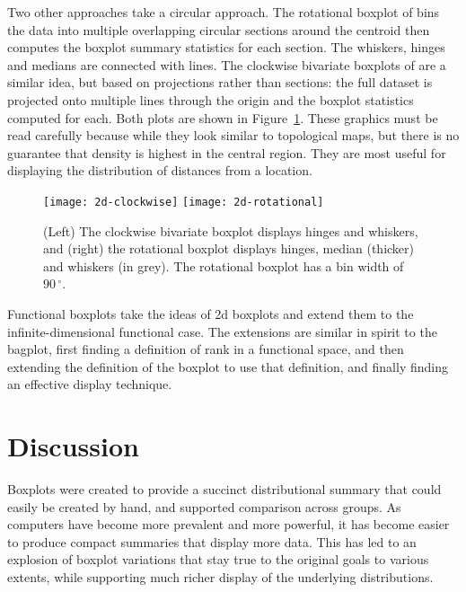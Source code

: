 \documentclass[oneside]{article}
\begin{document}
Two other approaches take a circular approach. The rotational boxplot of \citet{muth:2000} bins the data into multiple overlapping circular sections around the centroid then computes the boxplot summary statistics for each section. The whiskers, hinges and medians are connected with lines. The clockwise bivariate boxplots of \citet{corbellini:2002} are a similar idea, but based on projections rather than sections: the full dataset is projected onto multiple lines through the origin and the boxplot statistics computed for each. Both plots are shown in Figure~\ref{fig:2d-circular}. These graphics must be read carefully because while they look similar to topological maps, but there is no guarantee that density is highest in the central region. They are most useful for displaying the distribution of distances from a location.

\begin{figure}[htbp]
  \centering
  \texttt{[image: 2d-clockwise]}%
  \texttt{[image: 2d-rotational]}%

  \caption{(Left) The clockwise bivariate boxplot displays hinges and whiskers, and (right) the rotational boxplot displays hinges, median (thicker) and whiskers (in grey). The rotational boxplot has a bin width of $90\,^{\circ}$. }

  \label{fig:2d-circular}
\end{figure}

Functional boxplots \citep{hyndman:2010,sun:2011} take the ideas of 2d boxplots and extend them to the infinite-dimensional functional case. The extensions are similar in spirit to the bagplot, first finding a definition of rank in a functional space, and then extending the definition of the boxplot to use that definition, and finally finding an effective display technique.

\section{Discussion}
\label{sec:discussion}

Boxplots were created to provide a succinct distributional summary that could easily be created by hand, and supported comparison across groups. As computers have become more prevalent and more powerful, it has become easier  to produce compact summaries that display more data. This has led to an explosion of boxplot variations that stay true to the original goals to various extents, while supporting much richer display of the underlying distributions.
\end{document}
